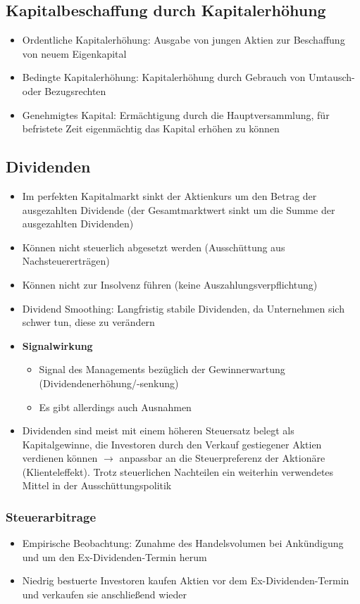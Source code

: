 \subsection{Kapitalbeschaffung durch Kapitalerhöhung}
\begin{itemize}
	\item Ordentliche Kapitalerhöhung: Ausgabe von jungen Aktien zur Beschaffung von neuem Eigenkapital
	\item Bedingte Kapitalerhöhung: Kapitalerhöhung durch Gebrauch von Umtausch- oder Bezugsrechten
	\item Genehmigtes Kapital: Ermächtigung durch die Hauptversammlung, für befristete Zeit eigenmächtig das Kapital erhöhen zu können
\end{itemize}


\subsection{Dividenden}
\begin{itemize}
	\item Im perfekten Kapitalmarkt sinkt der Aktienkurs um den Betrag der ausgezahlten Dividende (der Gesamtmarktwert sinkt um die Summe der ausgezahlten Dividenden)
	\item Können nicht steuerlich abgesetzt werden (Ausschüttung aus Nachsteuererträgen)
	\item Können nicht zur Insolvenz führen (keine Auszahlungsverpflichtung)
	\item Dividend Smoothing: Langfristig stabile Dividenden, da Unternehmen sich schwer tun, diese zu verändern
	\item \textbf{Signalwirkung}
	\begin{itemize}
		\item Signal des Managements bezüglich der Gewinnerwartung (Dividendenerhöhung/-senkung)
		\item Es gibt allerdings auch Ausnahmen
	\end{itemize}
	\item Dividenden sind meist mit einem höheren Steuersatz belegt als Kapitalgewinne, die Investoren durch den Verkauf gestiegener Aktien verdienen können $\rightarrow$ anpassbar an die Steuerpreferenz der Aktionäre (Klienteleffekt). Trotz steuerlichen Nachteilen ein weiterhin verwendetes Mittel in der Ausschüttungspolitik
\end{itemize}

\subsubsection{Steuerarbitrage}
\begin{itemize}
	\item Empirische Beobachtung: Zunahme des Handelsvolumen bei Ankündigung und um den Ex-Dividenden-Termin herum
	\item Niedrig bestuerte Investoren kaufen Aktien vor dem Ex-Dividenden-Termin und verkaufen sie anschließend wieder
\end{itemize}


